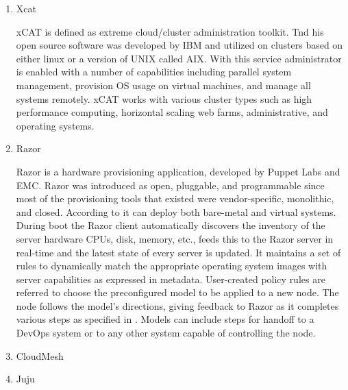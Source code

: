 \begin{enumerate}
\item {} 
Xcat

xCAT is defined as extreme cloud/cluster administration
toolkit. Tnd his open source software was developed by IBM and
utilized on clusters based on either linux or a version of UNIX
called AIX. With this service administrator is enabled with
a number of capabilities including parallel system management,
provision OS usage on virtual machines, and manage all systems
remotely. \label{\detokenize{i524/technologies:id585}}{\hyperref[\detokenize{i524/technologies:www-xcat}]{\sphinxcrossref{{[}503{]}}}} xCAT works with various cluster types
such as high performance computing, horizontal scaling web farms,
administrative, and operating systems. \label{\detokenize{i524/technologies:id586}}{\hyperref[\detokenize{i524/technologies:www-03ibm}]{\sphinxcrossref{{[}504{]}}}}

\item {} 
Razor

Razor is a hardware provisioning application, developed by Puppet
Labs and EMC. Razor was introduced as open, pluggable, and
programmable since most of the provisioning tools that existed
were vendor-specific, monolithic, and closed. According to
\label{\detokenize{i524/technologies:id587}}{\hyperref[\detokenize{i524/technologies:razorwiki}]{\sphinxcrossref{{[}505{]}}}} it can deploy both bare-metal and virtual
systems. During boot the Razor client automatically discovers the
inventory of the server hardware \textendash{} CPUs, disk, memory, etc.,
feeds this to the Razor server in real-time and the latest state
of every server is updated. It maintains a set of rules to
dynamically match the appropriate operating system images with
server capabilities as expressed in metadata. User-created policy
rules are referred to choose the preconfigured model to be
applied to a new node. The node follows the model's directions,
giving feedback to Razor as it completes various steps as
specified in \label{\detokenize{i524/technologies:id588}}{\hyperref[\detokenize{i524/technologies:razorpuppet}]{\sphinxcrossref{{[}506{]}}}}. Models can include steps for
handoff to a DevOps system or to any other system capable of
controlling the node.

\item {} 
CloudMesh

\item {} 
Juju


\end{enumerate}
